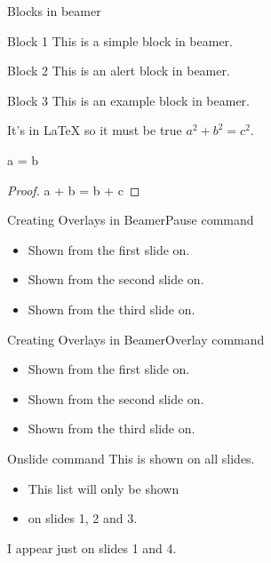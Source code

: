 \documentclass{beamer}
\begin{document}
\begin{frame}{Blocks in beamer}{}
\begin{block}{Block 1}
This is a simple block in beamer.
\end{block}
\begin{alertblock}{Block 2}
This is an alert block in beamer.
\end{alertblock}
\begin{exampleblock}{Block 3}
This is an example block in beamer.
\end{exampleblock}
\begin{theorem}
    It's in \LaTeX{} so it must be true $ a^2 + b^2 = c^2$.
\end{theorem}
\begin{corollary}
    a = b
\end{corollary}
\begin{proof}
    a + b = b + c
\end{proof}
\end{frame}

\begin{frame}{Creating Overlays in Beamer}{Pause command}
\begin{itemize}
    \item Shown from the first slide on.
\pause
    \item Shown from the second slide on.
\pause
    \item Shown from the third slide on.
\end{itemize}
\end{frame}

\begin{frame}{Creating Overlays in Beamer}{Overlay command}
\begin{itemize}
    \item<1-> Shown from the first slide on.
\pause
    \item<2-3> Shown from the second slide on.
\pause
    \item<3-> Shown from the third slide on.
\end{itemize}
\end{frame}


 \begin{frame}{Onslide command}
This is shown on all slides.
\begin{itemize}
    \item This list will only be shown
    \item on slides 1, 2 and 3.
\end{itemize}
I appear just on slides 1 and 4.
\end{frame}
\end{document}
